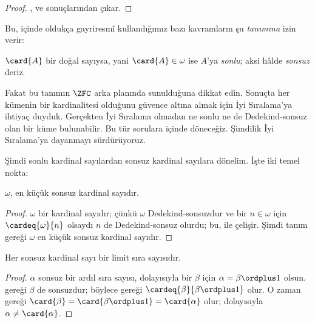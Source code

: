 \begin{proof}
,
 ve
 sonuçlarından çıkar.
\end{proof}

Bu,  içinde oldukça gayriresmî kullandığımız bazı
kavramların şu \emph{tanımına} izin verir:

\begin{defn}
$\card{A}$ bir doğal sayıysa, yani $\card{A}\in\omega$ ise $A$'ya
\emph{sonlu}; aksi hâlde \emph{sonsuz} deriz.
\end{defn}
\noindent
Fakat bu tanımın $\ZFC$ arka planında sunulduğuna dikkat edin. Sonuçta her
kümenin bir kardinalitesi olduğunu güvence altına almak için İyi Sıralama'ya
ihtiyaç duyduk. Gerçekten İyi Sıralama olmadan ne sonlu ne de
Dedekind-sonsuz olan bir küme bulunabilir. Bu tür sorulara
 içinde döneceğiz. Şimdilik İyi Sıralama'ya
dayanmayı sürdürüyoruz.

Şimdi sonlu kardinal sayılardan sonsuz kardinal sayılara dönelim. İşte iki
temel nokta:

\begin{cor}
$\omega$, en küçük sonsuz kardinal sayıdır.
\end{cor}

\begin{proof}
$\omega$ bir kardinal sayıdır; çünkü $\omega$ Dedekind-sonsuzdur ve bir
$n\in\omega$ için $\cardeq{\omega}{n}$ olsaydı $n$ de Dedekind-sonsuz
olurdu; bu,  ile
çelişir. Şimdi tanım gereği $\omega$ en küçük sonsuz kardinal sayıdır.
\end{proof}

\begin{cor}
Her sonsuz kardinal sayı bir limit sıra sayısıdır.
\end{cor}

\begin{proof}
$\alpha$ sonsuz bir ardıl sıra sayısı, dolayısıyla bir $\beta$ için
$\alpha=\beta\ordplus1$ olsun.  gereği $\beta$
de sonsuzdur; böylece
 gereği
$\cardeq{\beta}{\beta\ordplus1}$ olur. O zaman
 gereği
$\card{\beta}=\card{\beta\ordplus1}=\card{\alpha}$ olur; dolayısıyla
$\alpha\neq\card{\alpha}$.
\end{proof}

